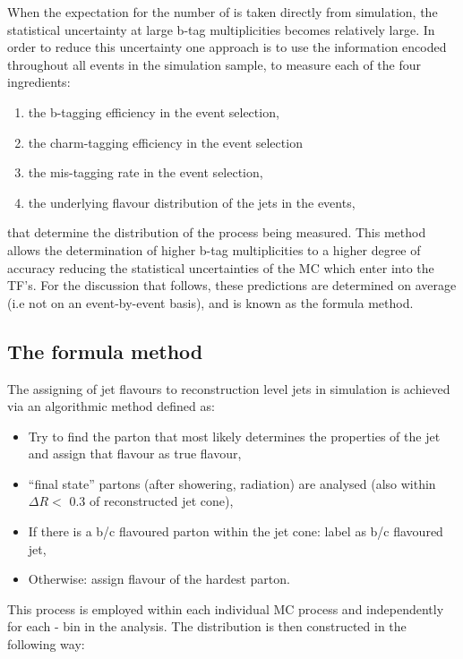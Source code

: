 When the expectation for the number of \nbreco is taken directly from simulation, the statistical uncertainty at large b-tag multiplicities becomes relatively large. In order to reduce this uncertainty one approach is to use the information encoded throughout all events in the simulation sample, to measure each of the four ingredients:

\begin{enumerate}
\item the b-tagging efficiency in the event selection,
\item the charm-tagging efficiency in the event selection
\item the mis-tagging rate in the event selection,
\item the underlying flavour distribution of the jets in the events,
\end{enumerate}

 that determine the \nbreco distribution of the process being measured. This method allows the determination of higher b-tag multiplicities to a higher degree of accuracy reducing the statistical uncertainties of the MC which enter into the \ac{TF}'s. For the discussion that follows, these predictions are determined on average (i.e not on an event-by-event basis), and is known as the formula method.

\subsection{The formula method}
\label{subsec:formulamethod}

The assigning of jet flavours to reconstruction level jets in simulation is achieved via an algorithmic method defined as:

\begin{itemize}
\item Try to find the parton that most likely determines the properties of the jet and assign that flavour as true flavour,
\item ``final state'' partons (after showering, radiation) are analysed (also within $\Delta R <$ 0.3 of reconstructed jet cone),
\item If there is a b/c flavoured parton within the jet cone: label as b/c flavoured jet,
\item Otherwise: assign flavour of the hardest parton.
\end{itemize}

This process is employed within each individual MC process and independently for each \theht - \njet bin in the analysis. The \nbreco distribution is then constructed in the following way:

